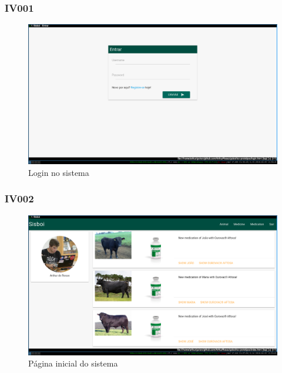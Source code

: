 \documentclass[12pt]{article}
\begin{document}
\begin{titlepage}
\subsubsection{IV001}

\begin{figure}[!h]
\begin{center}
\caption{Login no sistema}
\includegraphics[width=13cm]{img/prototipos/login.png}


\end{center}
\end{figure}


\subsubsection{IV002}

\begin{figure}[!h]
\begin{center}
\caption{Página inicial do sistema}
\includegraphics[width=13cm]{img/prototipos/index.png}



\end{center}
\end{figure}
\end{titlepage}
\end{document}
